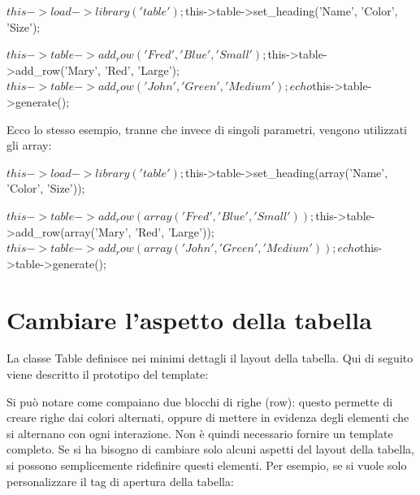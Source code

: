 \begin{code}
$this->load->library('table');

$this->table->set_heading('Name', 'Color', 'Size');

$this->table->add_row('Fred', 'Blue', 'Small');
$this->table->add_row('Mary', 'Red', 'Large');
$this->table->add_row('John', 'Green', 'Medium');

echo $this->table->generate();
\end{code}

Ecco lo stesso esempio, tranne che invece di singoli parametri, vengono utilizzati gli array:

\begin{code}
$this->load->library('table');

$this->table->set_heading(array('Name', 'Color', 'Size'));

$this->table->add_row(array('Fred', 'Blue', 'Small'));
$this->table->add_row(array('Mary', 'Red', 'Large'));
$this->table->add_row(array('John', 'Green', 'Medium'));

echo $this->table->generate();
\end{code}

\section*{Cambiare l'aspetto della tabella}
La classe Table definisce nei minimi dettagli il layout della tabella. Qui di seguito viene descritto il prototipo del template:


Si può notare come compaiano due blocchi di righe (row): questo permette di creare righe dai colori alternati, oppure di mettere in evidenza degli elementi che si alternano con ogni interazione. Non è quindi necessario fornire un template completo. Se si ha bisogno di cambiare solo alcuni aspetti del layout della tabella, si possono semplicemente ridefinire questi elementi. Per esempio, se si vuole solo personalizzare il tag di apertura della tabella:


